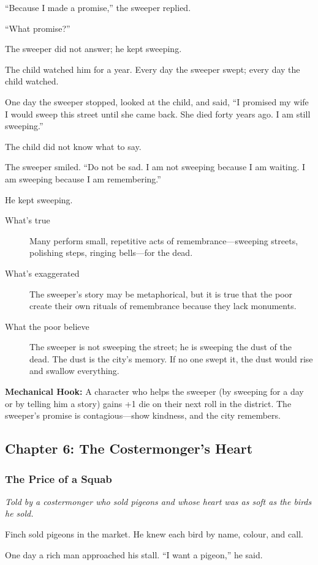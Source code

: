 \documentclass[11pt]{article}
\begin{document}
“Because I made a promise,” the sweeper replied.

“What promise?”

The sweeper did not answer; he kept sweeping.

The child watched him for a year. Every day the sweeper swept; every day the child watched.

One day the sweeper stopped, looked at the child, and said, “I promised my wife I would sweep this street until she came back. She died forty years ago. I am still sweeping.”

The child did not know what to say.

The sweeper smiled. “Do not be sad. I am not sweeping because I am waiting. I am sweeping because I am remembering.”

He kept sweeping.

\begin{description}
\item[What's true] Many perform small, repetitive acts of remembrance—sweeping streets, polishing steps, ringing bells—for the dead.
\item[What's exaggerated] The sweeper’s story may be metaphorical, but it is true that the poor create their own rituals of remembrance because they lack monuments.
\item[What the poor believe] The sweeper is not sweeping the street; he is sweeping the dust of the dead. The dust is the city’s memory. If no one swept it, the dust would rise and swallow everything.
\end{description}

\textbf{Mechanical Hook:} A character who helps the sweeper (by sweeping for a day or by telling him a story) gains +1 die on their next roll in the district. The sweeper’s promise is contagious—show kindness, and the city remembers.

\subsection{Chapter 6: The Costermonger's Heart}
\subsubsection{The Price of a Squab}
\textit{Told by a costermonger who sold pigeons and whose heart was as soft as the birds he sold.}

Finch sold pigeons in the market. He knew each bird by name, colour, and call.

One day a rich man approached his stall. “I want a pigeon,” he said.
\end{document}
